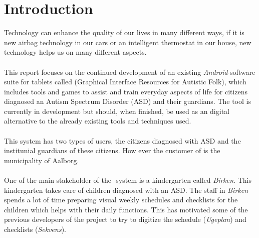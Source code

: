 \chapter{Introduction}
\label{cha:introduction}

Technology can enhance the quality of our lives in many different ways, if it is new airbag technology in our cars or an intelligent thermostat in our house, new technology helps us on many different aspects. 
\\\\
This report focuses on the continued development of an existing \emph{Android}-software suite for tablets called \giraf (Graphical Interface Resources for Autistic Folk), which includes tools and games to assist and train everyday aspects of life for citizens diagnosed an Autism Spectrum Disorder (ASD) and their guardians. The tool is currently in development but should, when finished, be used as an digital alternative to the already existing tools and techniques used. 
\\\\
This system has two types of users, the citizens diagnosed with ASD and the institunial guardians of these citizens. How ever the customer of \giraf is the municipality of Aalborg.
\\\\
One of the main stakeholder of the \giraf-system is a kindergarten called \emph{Birken}. This kindergarten takes care of children diagnosed with an ASD. The staff in \emph{Birken} spends a lot of time preparing visual weekly schedules and checklists for the children which helps with their daily functions. This has motivated some of the previous developers of the \giraf project to try to digitize the schedule (\emph{Ugeplan}) and checklists (\emph{Sekvens}). 
\\\\



